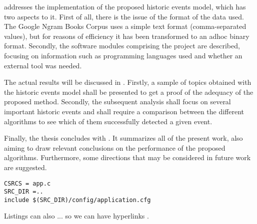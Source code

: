  addresses the implementation of the proposed historic events model, which has two aspects to it. First of all, there is the issue of the format of the data used. The Google Ngram Books Corpus uses a simple text format (comma-separated values), but for reasons of efficiency it has been transformed to an adhoc binary format. Secondly, the software modules comprising the project are described, focusing on information such as programming languages used and whether an external tool was needed.

The actual results will be discussed in . Firstly, a sample of topics obtained with the historic events model shall be presented to get a proof of the adequacy of the proposed method. Secondly, the subsequent analysis shall focus on several important historic events and shall require a comparison between the different algorithms to see which of them successfully detected a given event.

Finally, the thesis concludes with . It summarizes all of the present work, also aiming to draw relevant conclusions on the performance of the proposed algorithms. Furthermore, some directions that may be considered in future work are suggested.

\lstset{language=make,caption=Application Makefile,label=lst:app-make}
\begin{lstlisting}
CSRCS = app.c
SRC_DIR =..
include $(SRC_DIR)/config/application.cfg
\end{lstlisting}

Listings can also ... so we can have hyperlinks .
